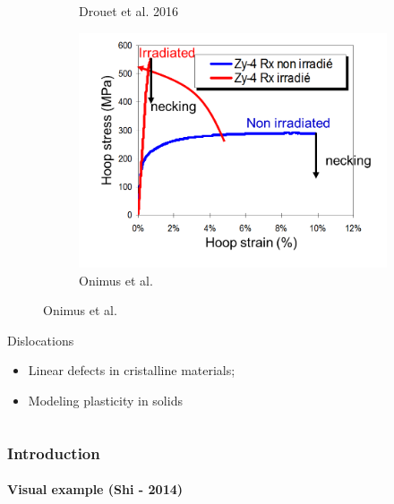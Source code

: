 \documentclass[aspectratio=1610,t,10pt]{beamer}
\begin{document}
\begin{frame}
\begin{columns}[c]
\begin{column}{.48\textwidth}
\begin{figure}
\begin{subfigure}[c]{0.48\textwidth}
		    		\caption{ Drouet et al. 2016 }
		    	\end{subfigure}
		    	\begin{subfigure}[c]{0.48\textwidth}
		    		\centering
		    		\includegraphics[width=\linewidth, keepaspectratio]{img/sigeps}
		    		\caption{ Onimus et al.}
		    	\end{subfigure}
	    	\end{figure}
		    	\begin{block}{Dislocations}
	            \begin{itemize}
	            	\item Linear defects in cristalline materials;
	            	\item Modeling plasticity in solids
	            \end{itemize}
            	 \end{block}        
	    \end{column}
    \end{columns}
\end{frame}




\begin{frame}
\frametitle{Introduction}
\framesubtitle{Visual example (Shi - 2014)}
\centering

\end{frame}
\end{document}
